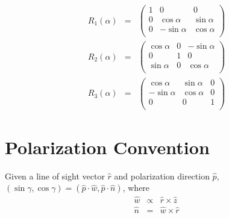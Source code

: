 \documentclass[10pt,preprint]{aastex}
\begin{document}
\begin{eqnarray}
R_1(\alpha) &=&
\left(\begin{array}{ccc}
1 & 0 & 0 \\
0 & \cos\alpha & \sin\alpha \\
0 & -\sin\alpha & \cos\alpha \\
\end{array}\right)
\\
R_2(\alpha) &=&
\left(\begin{array}{ccc}
\cos\alpha & 0 & -\sin\alpha \\
0 & 1 & 0 \\
\sin\alpha & 0 & \cos\alpha \\
\end{array}\right)
\\
R_3(\alpha) &=&
\left(\begin{array}{ccc}
\cos\alpha & \sin\alpha & 0 \\
-\sin\alpha & \cos\alpha & 0 \\
0 & 0 & 1 \\
\end{array}\right)
\end{eqnarray}

\section{Polarization Convention}

Given a line of sight vector $\hat r$ and polarization direction $\hat p$,
$(\sin\gamma,\cos\gamma) = (\hat p \cdot \hat w, \hat p \cdot \hat n)$, where
\begin{eqnarray}
\hat w &\propto& \hat r \times \hat z
\\
\hat n &=& \hat w \times \hat r
\end{eqnarray}
\end{document}

